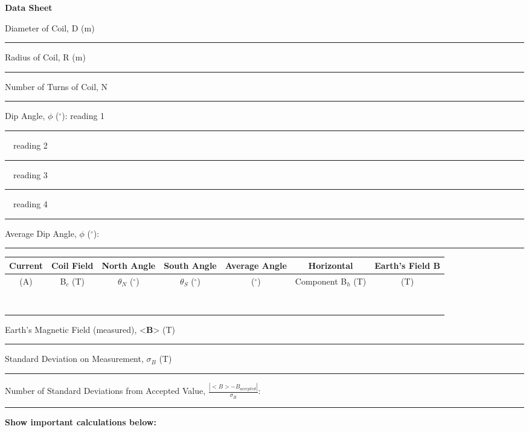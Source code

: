 {\centering \textbf{Data Sheet}\par}


Diameter of Coil, D (m)  \rule{2cm}{.1pt}  

Radius of Coil, R (m) \rule{2cm}{.1pt} 

Number of Turns of Coil, N  \rule{2cm}{.1pt}

Dip Angle, \( \phi  \) (\( ^{\circ } \)): reading 1 \rule{1cm}{.1pt}
~~reading 2 \rule{1cm}{.1pt} ~~reading 3 \rule{1cm}{.1pt} ~~reading
4 \rule{1cm}{.1pt}

Average Dip Angle, \( \phi  \) (\( ^{\circ } \)): \rule{2cm}{.1pt}

\vspace{0.3cm}
{\centering \begin{tabular}{|c|c|c|c|c|c|c|}
\hline 
Current  &
Coil Field &
North Angle &
South Angle &
Average Angle &
Horizontal &
Earth's Field \textbf{B} \\
\hline
(A)&
B\( _{c} \) (T)&
\( \theta  \)\( _{N} \) (\( ^{\circ } \))&
\( \theta  \)\( _{S} \) (\( ^{\circ } \))&
(\( ^{\circ } \))&
Component B\( _{h} \) (T)&
(T)\\
\hline 
&
&
&
&
&
&
\\
\hline 
&
&
&
&
&
&
\\
\hline 
&
&
&
&
&
&
\\
\hline 
&
&
&
&
&
&
\\
\hline 
&
&
&
&
&
&
\\
\hline 
&
&
&
&
&
&
\\
\hline 
&
&
&
&
&
&
\\
\hline 
&
&
&
&
&
&
\\
\hline
\end{tabular}\par}
\vspace{0.3cm}

\vspace{15mm}
Earth's Magnetic Field (measured), <\textbf{B}> (T) \rule{2cm}{.1pt}

Standard Deviation on Measurement, \( \sigma _{B} \) (T) \rule{2cm}{.1pt}

Number of Standard Deviations from Accepted Value, \( \frac{\left| <B>-B_{accepted}\right| }{\sigma _{B}} \):
\rule{2cm}{.1pt} 

\textbf{Show important calculations below:}
